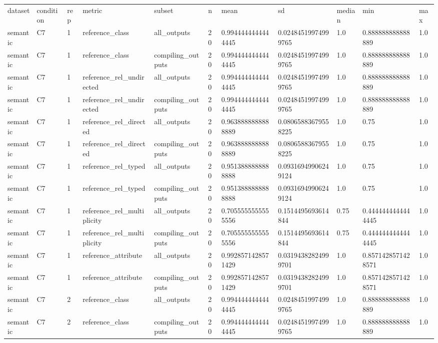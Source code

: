 \begin{tabular}{lllllllllll}
dataset & condition & rep & metric & subset & n & mean & sd & median & min & max \\
semantic & C7 & 1 & reference\_class & all\_outputs & 20 & 0.9944444444444445 & 0.02484519974999765 & 1.0 & 0.888888888888889 & 1.0 \\
semantic & C7 & 1 & reference\_class & compiling\_outputs & 20 & 0.9944444444444445 & 0.02484519974999765 & 1.0 & 0.888888888888889 & 1.0 \\
semantic & C7 & 1 & reference\_rel\_undirected & all\_outputs & 20 & 0.9944444444444445 & 0.02484519974999765 & 1.0 & 0.888888888888889 & 1.0 \\
semantic & C7 & 1 & reference\_rel\_undirected & compiling\_outputs & 20 & 0.9944444444444445 & 0.02484519974999765 & 1.0 & 0.888888888888889 & 1.0 \\
semantic & C7 & 1 & reference\_rel\_directed & all\_outputs & 20 & 0.9638888888888889 & 0.08065883679558225 & 1.0 & 0.75 & 1.0 \\
semantic & C7 & 1 & reference\_rel\_directed & compiling\_outputs & 20 & 0.9638888888888889 & 0.08065883679558225 & 1.0 & 0.75 & 1.0 \\
semantic & C7 & 1 & reference\_rel\_typed & all\_outputs & 20 & 0.9513888888888888 & 0.09316949906249124 & 1.0 & 0.75 & 1.0 \\
semantic & C7 & 1 & reference\_rel\_typed & compiling\_outputs & 20 & 0.9513888888888888 & 0.09316949906249124 & 1.0 & 0.75 & 1.0 \\
semantic & C7 & 1 & reference\_rel\_multiplicity & all\_outputs & 20 & 0.7055555555555556 & 0.1514495693614844 & 0.75 & 0.4444444444444445 & 1.0 \\
semantic & C7 & 1 & reference\_rel\_multiplicity & compiling\_outputs & 20 & 0.7055555555555556 & 0.1514495693614844 & 0.75 & 0.4444444444444445 & 1.0 \\
semantic & C7 & 1 & reference\_attribute & all\_outputs & 20 & 0.9928571428571429 & 0.03194382824999701 & 1.0 & 0.8571428571428571 & 1.0 \\
semantic & C7 & 1 & reference\_attribute & compiling\_outputs & 20 & 0.9928571428571429 & 0.03194382824999701 & 1.0 & 0.8571428571428571 & 1.0 \\
semantic & C7 & 2 & reference\_class & all\_outputs & 20 & 0.9944444444444445 & 0.02484519974999765 & 1.0 & 0.888888888888889 & 1.0 \\
semantic & C7 & 2 & reference\_class & compiling\_outputs & 20 & 0.9944444444444445 & 0.02484519974999765 & 1.0 & 0.888888888888889 & 1.0 \\

\end{tabular}
